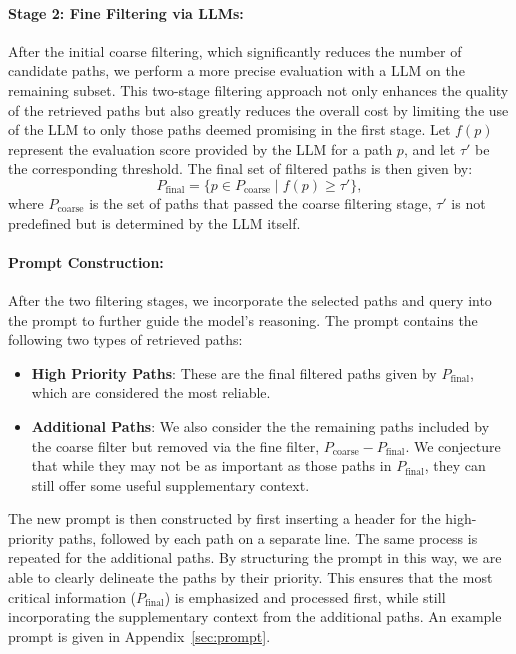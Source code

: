 \documentclass[11pt]{article}
\newcommand{\jt}[1]{{\color{red}[JT:#1]}}
\begin{document}
\paragraph{Stage 2: Fine Filtering via LLMs:}  
After the initial coarse filtering, which significantly reduces the number of candidate paths, we perform a more precise evaluation with  a LLM on the remaining subset. This two-stage filtering approach not only enhances the quality of the retrieved paths but also greatly reduces the overall cost by limiting the use of the LLM to only those paths deemed promising in the first stage. Let \( f(p) \) represent the evaluation score provided by the LLM for a path \( p \), and let \( \tau' \) be the corresponding threshold. The final set of filtered paths is then given by:
\begin{equation}
P_{\text{final}} = \{ p \in P_{\text{coarse}} \mid f(p) \geq \tau' \},
\end{equation}
where \( P_{\text{coarse}} \) is the set of paths that passed the coarse filtering stage, $\tau'$ is not predefined but is determined by the LLM itself.


\paragraph{Prompt Construction:}  

After the two filtering stages, we incorporate the selected paths and query into the prompt to further guide the model's reasoning. The prompt contains the following two types of retrieved paths:
\begin{itemize}
    \item {\bf High Priority Paths}: These are the final filtered paths given by $P_{\text{final}}$, which are considered the most reliable.  
    \item {\bf Additional Paths}: We also consider the the remaining paths included by the coarse filter but removed via the fine filter, $P_{\text{coarse}} - P_{\text{final}}$.  We conjecture that while they may not be as important as those paths in  $P_{\text{final}}$, they can still offer some useful supplementary context.
\end{itemize}

The new prompt is then constructed by first inserting a header for the high-priority paths, followed by each path on a separate line. The same process is repeated for the additional paths. By structuring the prompt in this way, we are able to clearly delineate the paths by their priority. This ensures that the most critical information ($P_{\text{final}}$) is emphasized and processed first, while still incorporating the supplementary context from the additional paths. An example prompt is given in Appendix~\ref{sec:prompt}.
\end{document}
